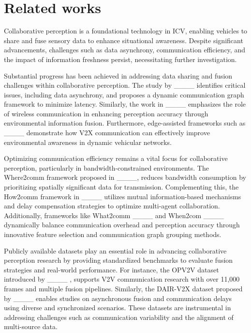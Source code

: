 \section{Related works}
Collaborative perception is a foundational technology in ICV, enabling vehicles to share and fuse sensory data to enhance situational awareness. Despite significant advancements, challenges such as data asynchrony, communication efficiency, and the impact of information freshness persist, necessitating further investigation. 


Substantial progress has been achieved in addressing data sharing and fusion challenges within collaborative perception. The study by ____ identifies critical issues, including data asynchrony, and proposes a dynamic communication graph framework to minimize latency. Similarly, the work in ____ emphasizes the role of wireless communication in enhancing perception accuracy through environmental information fusion. Furthermore, edge-assisted frameworks such as  ____ demonstrate how V2X communication can effectively improve environmental awareness in dynamic vehicular networks.

Optimizing communication efficiency remains a vital focus for collaborative perception, particularly in bandwidth-constrained environments. The Where2comm framework proposed in ____, reduces bandwidth consumption by prioritizing spatially significant data for transmission. Complementing this, the How2comm framework in ____ utilizes mutual information-based mechanisms and delay compensation strategies to optimize multi-agent collaboration. Additionally, frameworks like What2comm ____ and When2com ____ dynamically balance communication overhead and perception accuracy through innovative feature selection and communication graph grouping methods.

Publicly available datasets play an essential role in advancing collaborative perception research by providing standardized benchmarks to evaluate fusion strategies and real-world performance. For instance, the OPV2V dataset introduced by ____ , supports V2V communication research with over 11,000 frames and multiple fusion pipelines. Similarly, the DAIR-V2X dataset proposed by ____ enables studies on asynchronous fusion and communication delays using diverse and synchronized scenarios. These datasets are instrumental in addressing challenges such as communication variability and the alignment of multi-source data.

